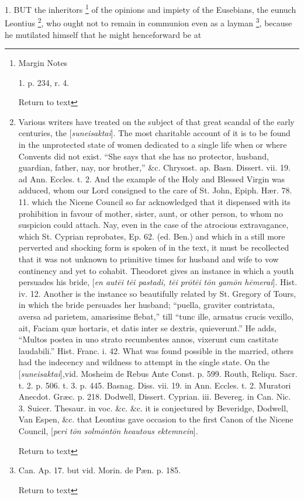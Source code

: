 1. BUT
the inheritors \footnote{Margin Notes

1. p. 234, r. 4.

Return to text} of the
opinions and impiety of the Eusebians, the eunuch Leontius \footnote{Various writers have treated on the subject of
that great scandal of the early centuries, the [\emph{suneisaktai}].
The most charitable account of it is to be found in the unprotected
state of women dedicated to a single life when or where Convents did
not exist. ``She says that she has no protector, husband, guardian,
father, nay, nor brother,'' \&c. Chrysost. ap. Basn. Dissert. vii.
19. ad Ann. Eccles. t. 2. And the example of the Holy and Blessed
Virgin was adduced, whom our Lord consigned to the care of St. John,
Epiph. Hær. 78. 11. which the Nicene Council so far acknowledged that
it dispensed with its prohibition in favour of mother, sister, aunt,
or other person, to whom no suspicion could attach. Nay, even in the
case of the atrocious extravagance, which St. Cyprian reprobates, Ep.
62. (ed. Ben.) and which in a still more perverted and shocking form
is spoken of in the text, it must be recollected that it was not
unknown to primitive times for husband and wife to vow continency and
yet to cohabit. Theodoret gives an instance in which a youth persuades
his bride, [\emph{en aut\={e}i t\={e}i pastadi, t\={e}i pr\={o}t\={e}i
t\={o}n gam\={o}n h\={e}merai}]. Hist. iv. 12. Another is
the instance so beautifully related by St. Gregory of Tours, in which
the bride persuades her husband; ``puella, graviter contristata, aversa
ad parietem, amarissime flebat,'' till ``tunc ille, armatus crucis
vexillo, ait, Faciam quæ hortaris, et datis inter se dextris,
quieverunt.'' He adds, ``Multos postea in uno strato recumbentes annos,
vixerunt cum castitate laudabili.'' Hist. Franc. i. 42. What was found
possible in the married, others had the indecency and wildness to
attempt in the single state. On the [\emph{suneisaktai}],vid. Mosheim
de Rebus Ante Const. p. 599. Routh, Reliqu. Sacr. t. 2. p. 506. t. 3.
p. 445. Basnag. Diss. vii. 19. in Ann. Eccles. t. 2. Muratori Anecdot.
Græc. p. 218. Dodwell, Dissert. Cyprian. iii. Bevereg. in Can. Nic.
3. Suicer. Thesaur. in voc. \&c. \&c. it is conjectured by
Beveridge, Dodwell, Van Espen, \&c. that Leontius gave occasion to
the first Canon of the Nicene Council, [\emph{peri t\={o}n solm\={o}nt\={o}n
heautous ektemnein}].

Return to text}, who ought not to remain in communion even as a layman \footnote{Can. Ap. 17. but vid. Morin. de Pæn. p. 185.

Return to text}, because he mutilated himself that he might henceforward be at
